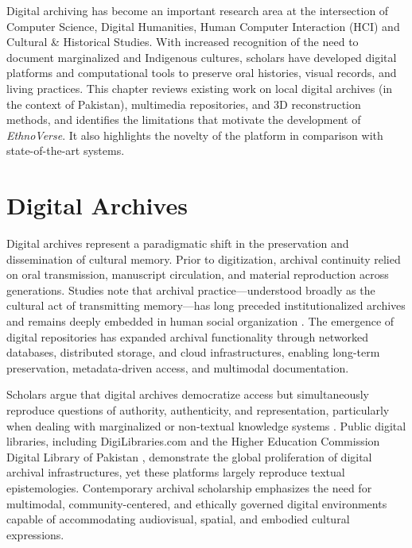 

Digital archiving has become an important research area at the intersection of 
Computer Science, Digital Humanities, Human Computer Interaction (HCI) and Cultural \& Historical Studies. With increased 
recognition of the need to document marginalized and Indigenous cultures, scholars 
have developed digital platforms and computational tools to preserve oral histories, 
visual records, and living practices. This chapter reviews existing work on local digital 
archives (in the context of Pakistan), multimedia repositories, and 3D reconstruction methods, and identifies the 
limitations that motivate the development of \textit{EthnoVerse}. It also highlights 
the novelty of the platform in comparison with state-of-the-art systems.

\section{Digital Archives}
Digital archives represent a paradigmatic shift in the preservation and dissemination of cultural memory. Prior to digitization, archival continuity relied on oral transmission, manuscript circulation, and material reproduction across generations. Studies note that archival practice—understood broadly as the cultural act of transmitting memory—has long preceded institutionalized archives and remains deeply embedded in human social organization \cite{schwartz2002, ernst2013}. The emergence of digital repositories has expanded archival functionality through networked databases, distributed storage, and cloud infrastructures, enabling long-term preservation, metadata-driven access, and multimodal documentation.

Scholars argue that digital archives democratize access but simultaneously reproduce questions of authority, authenticity, and representation, particularly when dealing with marginalized or non-textual knowledge systems \cite{ketelaar2001, gilliland2014}. Public digital libraries, including DigiLibraries.com \cite{digilibraries} and the Higher Education Commission Digital Library of Pakistan \cite{hecdigitallibrary}, demonstrate the global proliferation of digital archival infrastructures, yet these platforms largely reproduce textual epistemologies. Contemporary archival scholarship emphasizes the need for multimodal, community-centered, and ethically governed digital environments capable of accommodating audiovisual, spatial, and embodied cultural expressions.

